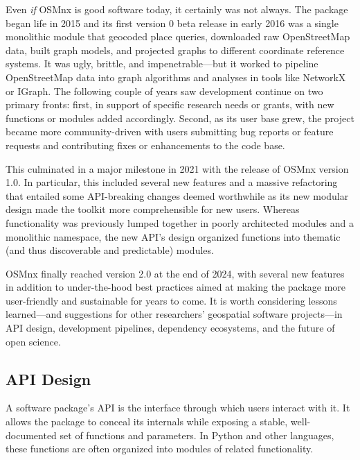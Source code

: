 \documentclass[12pt,letterpaper]{article} %
\begin{document}
Even \textit{if} OSMnx is good software today, it certainly was not always. The package began life in 2015 and its first version 0 beta release in early 2016 was a single monolithic module that geocoded place queries, downloaded raw OpenStreetMap data, built graph models, and projected graphs to different coordinate reference systems. It was ugly, brittle, and impenetrable---but it worked to pipeline OpenStreetMap data into graph algorithms and analyses in tools like NetworkX or IGraph. The following couple of years saw development continue on two primary fronts: first, in support of specific research needs or grants, with new functions or modules added accordingly. Second, as its user base grew, the project became more community-driven with users submitting bug reports or feature requests and contributing fixes or enhancements to the code base.

This culminated in a major milestone in 2021 with the release of OSMnx version 1.0. In particular, this included several new features and a massive refactoring that entailed some API-breaking changes deemed worthwhile as its new modular design made the toolkit more comprehensible for new users. Whereas functionality was previously lumped together in poorly architected modules and a monolithic namespace, the new API's design organized functions into thematic (and thus discoverable and predictable) modules.

OSMnx finally reached version 2.0 at the end of 2024, with several new features in addition to under-the-hood best practices aimed at making the package more user-friendly and sustainable for years to come. It is worth considering lessons learned---and suggestions for other researchers' geospatial software projects---in API design, development pipelines, dependency ecosystems, and the future of open science.

\subsection{API Design}

A software package's API is the interface through which users interact with it. It allows the package to conceal its internals while exposing a stable, well-documented set of functions and parameters. In Python and other languages, these functions are often organized into modules of related functionality.
\end{document}
